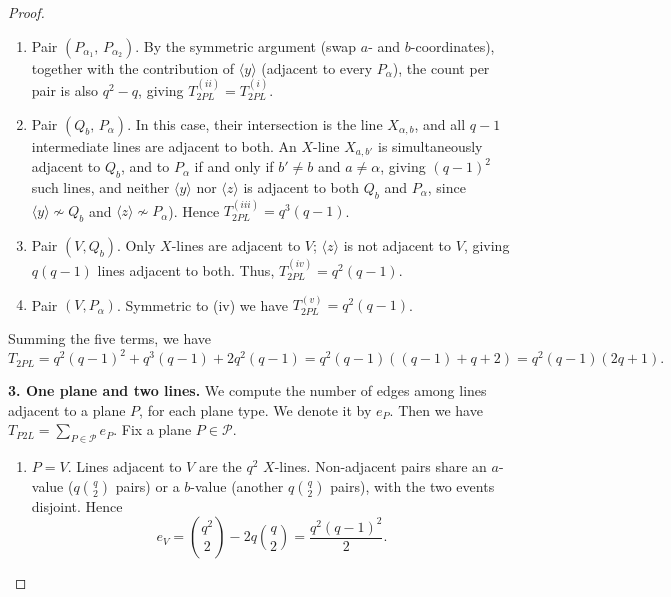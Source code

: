 \documentclass[10pt,a4paper]{amsart}
\begin{document}
\begin{proof}
\begin{enumerate}
\smallskip

\item[(ii)] Pair $(P_{\alpha_1},\,P_{\alpha_2})$. By the symmetric argument
(swap $a$- and $b$-coordinates), together with the contribution of
$\langle y \rangle$ (adjacent to every $P_\alpha$), the count per pair is
also $q^2-q$, giving $T_{2PL}^{(ii)} = T_{2PL}^{(i)}$.

\smallskip

\item[(iii)] Pair $(Q_b,\,P_\alpha)$. In this case, their intersection is the line $X_{\alpha, b}$, and all $q-1$ intermediate lines are adjacent to both.
An $X$-line $X_{a,b'}$ is simultaneously adjacent to $Q_b$, and to $P_\alpha$
if and only if $b'\neq b$ and $a\neq\alpha$, giving $(q-1)^2$ such lines, and
neither $\langle y \rangle$ nor $\langle z \rangle$ is adjacent to both $Q_b$
and $P_\alpha$, since $\langle y \rangle \not\sim Q_b$ and $\langle z \rangle
\not\sim P_\alpha$). Hence $T_{2PL}^{(iii)} = q^3(q-1)$.  
\smallskip

\item[(iv)] Pair $(V, Q_b)$. Only $X$-lines are adjacent to $V$; $\langle z
\rangle$ is not adjacent to $V$, giving $q(q-1)$ lines adjacent to both. Thus, $T_{2PL}^{(iv)}= q^2(q-1)$.
\smallskip

\item[(v)] Pair $(V, P_\alpha)$. Symmetric to (iv) we have  $T_{2PL}^{(v)}= q^2(q-1)$.
\end{enumerate}
Summing the five terms, we have
\[T_{2PL} = q^2(q-1)^2 + q^3(q-1) + 2q^2(q-1) = q^2(q-1) ((q-1)+q+2) = q^2(q-1)(2q+1).\]

\noindent\textbf{3. One plane and two lines.} We compute the number of edges among lines adjacent to a plane $P$, for each plane type. We denote it by $e_P$. Then we have $T_{P2L}=\sum_{P\in \mathcal{P}} e_P$. Fix a plane $P\in \mathcal{P}$.
\begin{enumerate}
\item[(i)] $P=V$. Lines adjacent to $V$ are the $q^2$ $X$-lines.  Non-adjacent pairs share an $a$-value ($q\binom{q}{2}$ pairs) or a $b$-value (another $q\binom{q}{2}$ pairs), with the two events disjoint.  Hence
\begin{equation}\label{eV-B2}
  e_{V}=\binom{q^2}{2}-2q\binom{q}{2}=\frac{q^2(q-1)^2}{2}.
\end{equation}


\end{enumerate}
\end{proof}
\end{document}
